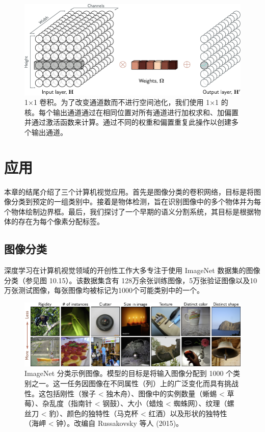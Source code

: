 \documentclass[lang=cn,newtx,10pt,scheme=chinese]{elegantbook}
\begin{document}
\begin{figure}[ht!]
	\centering
	\includegraphics[width=0.7\linewidth]{PDFFigures/UDLChap10PDF/Conv1DChannels.pdf}
	\caption{1×1 卷积。为了改变通道数而不进行空间池化，我们使用 1×1 的核。每个输出通道通过在相同位置对所有通道进行加权求和、加偏置并通过激活函数来计算。通过不同的权重和偏置重复此操作以创建多个输出通道。}
\end{figure}

\section{应用}
本章的结尾介绍了三个计算机视觉应用。首先是图像分类的卷积网络，目标是将图像分类到预定的一组类别中。接着是物体检测，旨在识别图像中的多个物体并为每个物体绘制边界框。最后，我们探讨了一个早期的语义分割系统，其目标是根据物体的存在为每个像素分配标签。

\subsection{图像分类}
深度学习在计算机视觉领域的开创性工作大多专注于使用 ImageNet 数据集的图像分类（参见图 10.15）。该数据集含有 128万余张训练图像，5万张验证图像以及10万张测试图像，每张图像均被标记为1000个可能类别中的一个。



\begin{figure}[ht!]
	\centering
	\includegraphics[width=0.7\linewidth]{PDFFigures/UDLChap10PDF/ConvImageNet.pdf}
	\caption{ImageNet 分类示例图像。模型的目标是将输入图像分配到 1000 个类别之一。这一任务因图像在不同属性（列）上的广泛变化而具有挑战性。这包括刚性（猴子 < 独木舟）、图像中的实例数量（蜥蜴 < 草莓）、杂乱度（指南针 < 钢鼓）、大小（蜡烛 < 蜘蛛网）、纹理（螺丝刀 < 豹）、颜色的独特性（马克杯 < 红酒）以及形状的独特性（海岬 < 钟）。改编自 Russakovsky 等人 (2015)。}
\end{figure}
\end{document}
